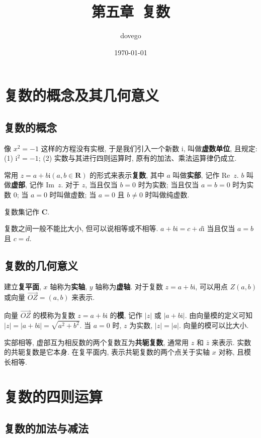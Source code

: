 \documentclass[titlepage]{ctexart}
\title{第五章~复数}
\author{dovego}
\date{\today}
\begin{document}
\maketitle


\section{复数的概念及其几何意义}

\subsection{复数的概念}

像 $x^2 = -1$ 这样的方程没有实根, 于是我们引入一个新数 i, 叫做\textbf{虚数单位}, 且规定:
(1) $\mathrm{i}^2 = -1$; (2) 实数与其进行四则运算时, 原有的加法、乘法运算律仍成立.

常用 $z = a + b\mathrm{i}   (a,b \in \mathbf{R})$ 的形式来表示\textbf{复数}, 其中 $a$ 叫做\textbf{实部}, 记作 Re~$z$.
$b$ 叫做\textbf{虚部}, 记作 Im~$z$.
对于 $z$, 当且仅当 $b = 0$ 时为实数; 当且仅当 $a = b = 0$ 时为实数 0; 当 $a = 0$ 时叫做虚数; 当 $a = 0$ 且 $b \neq 0$ 时叫做纯虚数.

复数集记作 $\mathbf{C}$.

复数之间一般不能比大小, 但可以说相等或不相等. $a + b\mathrm{i} = c + d\mathrm{i}$ 当且仅当 $a = b$ 且 $c = d$.

\subsection{复数的几何意义}

建立\textbf{复平面}, $x$ 轴称为\textbf{实轴}, $y$ 轴称为\textbf{虚轴}. 
对于复数 $z = a + b\mathrm{i}$, 可以用点 $Z(a,b)$ 或向量 $\overrightarrow{OZ} = (a, b)$ 来表示.

向量 $\overrightarrow{OZ}$ 的模称为复数 $z = a + b\mathrm{i}$ 的\textbf{模}, 记作 $|z|$ 或 $|a + b\mathrm{i}|$.
由向量模的定义可知 $|z| = |a + b\mathrm{i}| = \sqrt{a^2+ b^2}$. 当 $a = 0$ 时, $z$ 为实数, $|z| = |a|$. 向量的模可以比大小.

实部相等, 虚部互为相反数的两个复数互为\textbf{共轭复数}, 通常用 $z$ 和 $\bar{z}$ 来表示. 实数的共轭复数是它本身. 
在复平面内, 表示共轭复数的两个点关于实轴 $x$ 对称, 且模长相等.


\section{复数的四则运算}

\subsection{复数的加法与减法}
\end{document}
